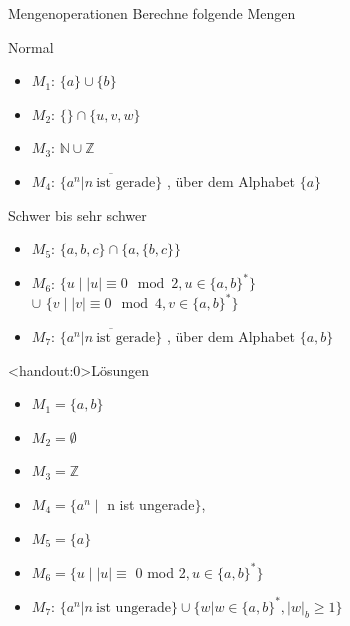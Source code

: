 \begin{frame}{Mengenoperationen}
    Berechne folgende Mengen
    \begin{alertblock}{Normal}
        \begin{itemize}
            \item $M_1$: $\{a\}\cup \{b\}$
            \item $M_2$: $\{\} \cap \{u, v, w\}$
            \item $M_3$: $\mathbb{N} \cup \mathbb{Z}$
            \item $M_4$: $\overline{\{a^{n} | n \ \text{ist gerade}\} }$ , über dem Alphabet $\{a\}$
        \end{itemize}
    \end{alertblock}
        \begin{alertblock}{Schwer bis sehr schwer}
        \begin{itemize}
            \item $M_5$: $\{a, b, c\} \cap  \{a, \{b, c\}\}$
            \item $M_6$: $\{u \mid |u| \equiv 0 \mod 2, u \in \{a, b\}^{*}\}$\\\hspace{0.65cm}$\cup$ $\{v \mid |v| \equiv 0 \mod 4, v \in \{a, b\}^{*}\}$
            \item $M_7$: $\overline{\{a^{n} | n \ \text{ist gerade}\} }$ , über dem Alphabet $\{a,b\}$
        \end{itemize}
    \end{alertblock}
\end{frame}

{
\begin{frame}<handout:0>{Lösungen}
  \begin{itemize}[<+- | alert@+>]
        \item 
            $M_1 = \{a, b\}$
        \item
            $M_2 = \emptyset$
        \item
            $M_3 = \mathbb{Z}$
        \item
            $M_4 = \{a^{n} \mid$ n ist ungerade$\}$, 
        \item
            $M_5 = \{a\}$
        \item
            $M_6 = \{u \mid |u| \equiv$ 0 mod 2$, u \in \{a, b\}^{*}\}$
        \item
            $M_7$: $\{a^{n} | n \ \text{ist ungerade}\} \cup\{w | w\in\{a,b\}^{*}, |w|_b \geq 1\}$
    \end{itemize}
\end{frame}
}
